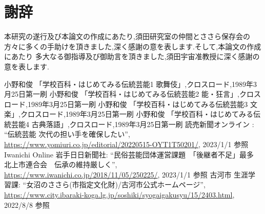 \documentclass[12pt]{ltjsarticle}
\begin{document}
\section{謝辞}
本研究の遂行及び本論文の作成にあたり,須田研究室の仲間とささら保存会の方々に多くの手助けを頂きました,深く感謝の意を表します.そして,本論文の作成にあたり
多大なる御指導及び御助言を頂きました,須田宇宙准教授に深く感謝の意を表します.
\newpage
{}
\begin{thebibliography}{99}
 小野和俊 「学校百科・はじめてみる伝統芸能1 歌舞伎」,クロスロード,1989年3月25日第一刷
 小野和俊 「学校百科・はじめてみる伝統芸能2 能・狂言」,クロスロード,1989年3月25日第一刷
 小野和俊 「学校百科・はじめてみる伝統芸能3 文楽」,クロスロード,1989年3月25日第一刷
 小野和俊 「学校百科・はじめてみる伝統芸能4 古典落語」,クロスロード,1989年3月25日第一刷
 読売新聞オンライン : ``伝統芸能 次代の担い手を確保したい'', \url{https://www.yomiuri.co.jp/editorial/20220515-OYT1T50201/}, 2023/1/1 参照
 Iwanichi Online 岩手日日新聞社: ``民俗芸能団体運営課題　「後継者不足」最多　北上市連合会　伝承の維持厳しく'', \url{https://www.iwanichi.co.jp/2018/11/05/250225/}, 2023/1/1 参照
 古河市 生涯学習課: ``女沼のささら(市指定文化財)/古河市公式ホームページ'', \url{https://www.city.ibaraki-koga.lg.jp/soshiki/syogaigakusyu/15/2403.html}, 2022/8/8 参照



\end{thebibliography}
\end{document}
